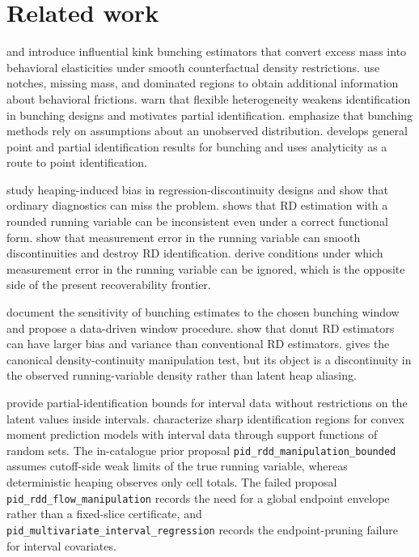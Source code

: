 \documentclass[11pt]{article}
\theoremstyle{definition}
\theoremstyle{plain}
\theoremstyle{remark}
\begin{document}
\section{Related work}
\citet{Saez2010Bunching} and \citet{ChettyFriedmanOlsenPistaferri2011Adjustment} introduce influential kink bunching estimators that convert excess mass into behavioral elasticities under smooth counterfactual density restrictions.  \citet{KlevenWaseem2013Notches} use notches, missing mass, and dominated regions to obtain additional information about behavioral frictions.  \citet{BertanhaMcCallumSeegert2021BetterBunching} warn that flexible heterogeneity weakens identification in bunching designs and motivates partial identification.  \citet{BertanhaMcCallumPayneSeegert2022Stata} emphasize that bunching methods rely on assumptions about an unobserved distribution.  \citet{Song2024GeneralBunching} develops general point and partial identification results for bunching and uses analyticity as a route to point identification.

\citet{BarrecaLindoWaddell2016HeapingRD} study heaping-induced bias in regression-discontinuity designs and show that ordinary diagnostics can miss the problem.  \citet{Dong2015RoundingRD} shows that RD estimation with a rounded running variable can be inconsistent even under a correct functional form.  \citet{DaveziesLeBarbanchon2017RDMeasurementError} show that measurement error in the running variable can smooth discontinuities and destroy RD identification.  \citet{DongKolesar2023IgnoreMeasurementError} derive conditions under which measurement error in the running variable can be ignored, which is the opposite side of the present recoverability frontier.

\citet{BoschDekkerStrohmaier2020Window} document the sensitivity of bunching estimates to the chosen bunching window and propose a data-driven window procedure.  \citet{NoackRothe2023DonutRD} show that donut RD estimators can have larger bias and variance than conventional RD estimators.  \citet{McCrary2008DensityTest} gives the canonical density-continuity manipulation test, but its object is a discontinuity in the observed running-variable density rather than latent heap aliasing.

\citet[Sec.~2, pp.~522--524]{ManskiTamer2002IntervalData} provide partial-identification bounds for interval data without restrictions on the latent values inside intervals.  \citet[Sec.~2, pp.~1790--1794]{BeresteanuMolchanovMolinari2011ConvexMoment} characterize sharp identification regions for convex moment prediction models with interval data through support functions of random sets.  The in-catalogue prior proposal \texttt{pid\_rdd\_manipulation\_bounded} assumes cutoff-side weak limits of the true running variable, whereas deterministic heaping observes only cell totals.  The failed proposal \texttt{pid\_rdd\_flow\_manipulation} records the need for a global endpoint envelope rather than a fixed-slice certificate, and \texttt{pid\_multivariate\_interval\_regression} records the endpoint-pruning failure for interval covariates.
\end{document}
